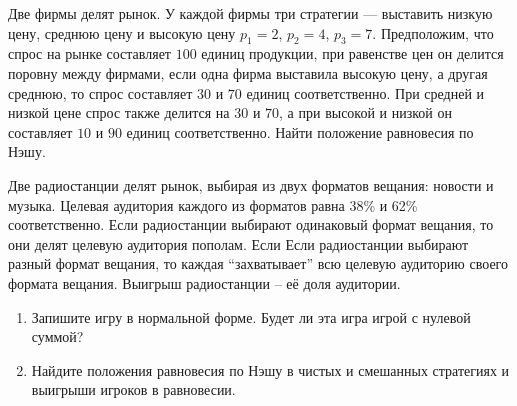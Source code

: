 \begin{exercise}
Две фирмы делят рынок. У каждой фирмы три стратегии --- выставить
низкую цену, среднюю цену и высокую цену $p_1=2$, $p_2=4$,
$p_3=7$. Предположим, что спрос на рынке составляет $100$ единиц
продукции, при равенстве цен он делится поровну между фирмами,
если одна фирма выставила высокую цену, а другая среднюю, то спрос
составляет $30$ и $70$ единиц соответственно. При средней и низкой
цене спрос также делится на $30$ и $70$, а при высокой и низкой
он составляет $10$ и $90$ единиц соответственно. Найти положение
равновесия по Нэшу.
\end{exercise}

\begin{exercise}
Две радиостанции делят рынок, выбирая из двух форматов вещания: новости и музыка.
Целевая аудитория каждого из форматов равна 38\% и 62\% соответственно. Если радиостанции
выбирают одинаковый формат вещания, то они делят целевую аудитория пополам.
Если Если радиостанции выбирают разный формат вещания, то каждая ``захватывает''
всю целевую аудиторию своего формата вещания. Выигрыш радиостанции -- её доля аудитории.
\begin{enumerate}
	\item Запишите игру в нормальной форме. 
	Будет ли эта игра игрой с нулевой суммой? %
	\item Найдите положения равновесия по Нэшу в чистых и смешанных стратегиях
	и выигрыши игроков в равновесии.
\end{enumerate}
\end{exercise}



